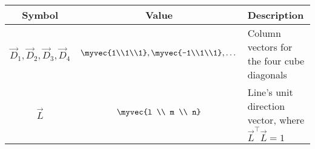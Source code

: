 \begin{tabular}{|c|c|p{5cm}|}
    \hline
    \textbf{Symbol} & \textbf{Value} & \textbf{Description}  \\
    \hline
    \textbf{$\vec{D}_1, \vec{D}_2, \vec{D}_3, \vec{D}_4$} & $\myvec{1\\1\\1}, \myvec{-1\\1\\1}, \dots$ & Column vectors for the four cube diagonals \\
    \hline
    \textbf{$\vec{L}$} & $\myvec{l \\ m \\ n}$ & Line's unit direction vector, where $\vec{L}^\top\vec{L} = 1$ \\
    \hline
\end{tabular}